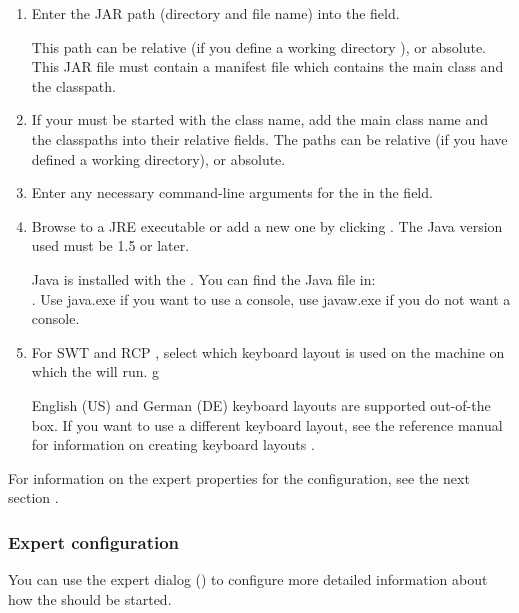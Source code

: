 \begin{enumerate}
\item Enter the JAR path (directory and file
  name) into the  field.  

This path can be relative (if you define a working directory ), or absolute. This JAR file must contain a manifest file which contains the main class and the classpath. 

\item If your \gdaut{} must be started with the class name, add the main class name and the classpaths into their relative fields. The paths can be relative (if you have defined a working directory), or absolute. 
\item Enter any necessary command-line arguments for the \gdaut{} in the
  field. 
\item Browse to a JRE executable or add a new one by clicking . 
The Java version used must be 1.5 or later. 

Java is installed with the \ite{}. You can find the Java file in:\\
.
Use java.exe if you want to use a console, use javaw.exe if you do not want a console. 
\item For SWT and RCP \gdauts{}, select which keyboard layout is used on the machine on which the \gdaut{} will run. 
g

English (US) and German (DE) keyboard layouts are supported out-of-the box. If you want to use a different keyboard layout, see the reference manual for information on creating keyboard layouts . 
\end{enumerate}
For information on the expert properties for the \gdaut{} configuration, see the next section . 

\subsubsection{Expert \gdaut{} configuration}
\label{ExpertAUTConfig}
You can use the expert dialog () to configure more detailed information about how the \gdaut{} should be started. 


